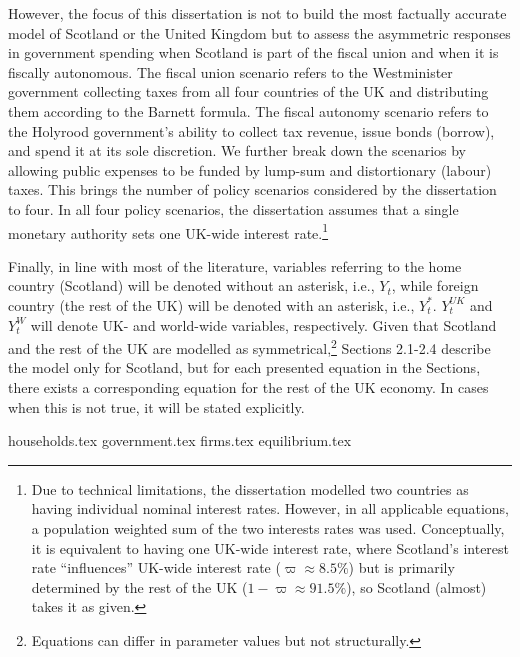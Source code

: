 However, the focus of this dissertation is not to build the most factually accurate model of Scotland or the United Kingdom but to assess the asymmetric responses in government spending when Scotland is part of the fiscal union and when it is fiscally autonomous. The fiscal union scenario refers to the Westminister government collecting taxes from all four countries of the UK and distributing them according to the Barnett formula. The fiscal autonomy scenario refers to the Holyrood government's ability to collect tax revenue, issue bonds (borrow), and spend it at its sole discretion. We further break down the scenarios by allowing public expenses to be funded by lump-sum and distortionary (labour) taxes. This brings the number of policy scenarios considered by the dissertation to four. In all four policy scenarios, the dissertation assumes that a single monetary authority sets one UK-wide interest rate.\footnote{Due to technical limitations, the dissertation modelled two countries as having individual nominal interest rates. However, in all applicable equations, a population weighted sum of the two interests rates was used. Conceptually, it is equivalent to having one UK-wide interest rate, where Scotland's interest rate ``influences'' UK-wide interest rate ($\varpi \approx 8.5\%$) but is primarily determined by the rest of the UK ($1-\varpi \approx 91.5\%$), so Scotland (almost) takes it as given.}

Finally, in line with most of the literature, variables referring to the home country (Scotland) will be denoted without an asterisk, i.e., $Y_t$, while foreign country (the rest of the UK) will be denoted with an asterisk, i.e., $Y^*_t$. $Y_t^{UK}$ and $Y_t^{W}$ will denote UK- and world-wide variables, respectively. Given that Scotland and the rest of the UK are modelled as symmetrical,\footnote{Equations can differ in parameter values but not structurally.} Sections 2.1-2.4 describe the model only for Scotland, but for each presented equation in the Sections, there exists a corresponding equation for the rest of the UK economy. In cases when this is not true, it will be stated explicitly.

\newpage
{households.tex}
\newpage
{government.tex}
\newpage
{firms.tex}
\newpage
{equilibrium.tex}